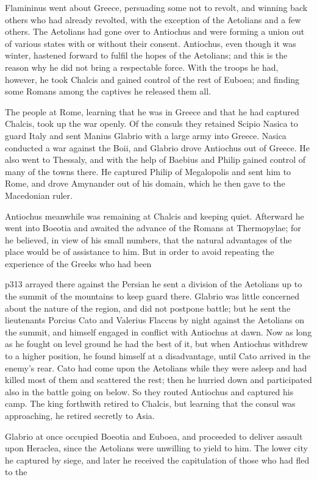 Flamininus went about Greece, persuading some not to revolt, and winning back others who had already revolted, with the exception of the Aetolians and a few others. The Aetolians had gone over to Antiochus and were forming a union out of various states with or without their consent. Antiochus, even though it was winter, hastened forward to fulfil the hopes of the Aetolians; and this is the reason why he did not bring a respectable force. With the troops he had, however, he took Chalcis and gained control of the rest of Euboea; and finding some Romans among the captives he released them all.

The people at Rome, learning that he was in Greece and that he had captured Chalcis, took up the war openly. Of the consuls they retained Scipio Nasica to guard Italy and sent Manius Glabrio with a large army into Greece. Nasica conducted a war against the Boii, and Glabrio drove Antiochus out of Greece. He also went to Thessaly, and with the help of Baebius and Philip gained control of many of the towns there. He captured Philip of Megalopolis and sent him to Rome, and drove Amynander out of his domain, which he then gave to the Macedonian ruler.

Antiochus meanwhile was remaining at Chalcis and keeping quiet. Afterward he went into Boeotia and awaited the advance of the Romans at Thermopylae; for he believed, in view of his small numbers, that the natural advantages of the place would be of assistance to him. But in order to avoid repeating the experience of the Greeks who had been

p313 arrayed there against the Persian he sent a division of the Aetolians up to the summit of the mountains to keep guard there. Glabrio was little concerned about the nature of the region, and did not postpone battle; but he sent the lieutenants Porcius Cato and Valerius Flaccus by night against the Aetolians on the summit, and himself engaged in conflict with Antiochus at dawn. Now as long as he fought on level ground he had the best of it, but when Antiochus withdrew to a higher position, he found himself at a disadvantage, until Cato arrived in the enemy's rear. Cato had come upon the Aetolians while they were asleep and had killed most of them and scattered the rest; then he hurried down and participated also in the battle going on below. So they routed Antiochus and captured his camp. The king forthwith retired to Chalcis, but learning that the consul was approaching, he retired secretly to Asia.

Glabrio at once occupied Boeotia and Euboea, and proceeded to deliver assault upon Heraclea, since the Aetolians were unwilling to yield to him. The lower city he captured by siege, and later he received the capitulation of those who had fled to the

